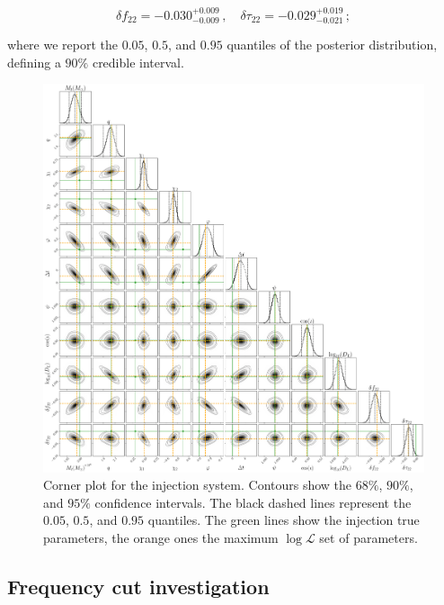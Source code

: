 \begin{equation}
\delta f_{22} = -0.030^{+0.009}_{-0.009} \,, \quad 
\delta \tau_{22} = -0.029^{+0.019}_{-0.021} \,;
\end{equation}

\noindent 

where we report the $0.05$, $0.5$, and $0.95$ quantiles of the posterior distribution, defining a $90\%$ credible interval.

\begin{figure}[h!]
    \centering
    \includegraphics[width=1\textwidth]{Images/Corner_inj_snr_600_M_2e6.pdf}
    \caption{Corner plot for the injection system. Contours show the $68\%$, $90\%$, and $95\%$ confidence intervals. The black dashed lines represent the $0.05$, $0.5$, and $0.95$ quantiles. The green lines show the injection true parameters, the orange ones the maximum $ \log \mathcal{L}$ set of parameters.}
    \label{fig:Corner_inj_snr_600_M_2e6}
\end{figure}



\subsection{Frequency cut investigation}



